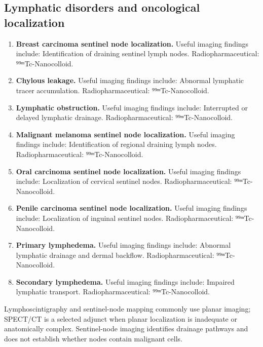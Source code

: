 \subsection{Lymphatic disorders and oncological localization}
\begin{enumerate}[leftmargin=*,itemsep=0.45em,topsep=0.4em]
\item \textbf{Breast carcinoma sentinel node localization.} Useful imaging findings include: Identification of draining sentinel lymph nodes. Radiopharmaceutical: ⁹⁹ᵐTc-Nanocolloid.
\item \textbf{Chylous leakage.} Useful imaging findings include: Abnormal lymphatic tracer accumulation. Radiopharmaceutical: ⁹⁹ᵐTc-Nanocolloid.
\item \textbf{Lymphatic obstruction.} Useful imaging findings include: Interrupted or delayed lymphatic drainage. Radiopharmaceutical: ⁹⁹ᵐTc-Nanocolloid.
\item \textbf{Malignant melanoma sentinel node localization.} Useful imaging findings include: Identification of regional draining lymph nodes. Radiopharmaceutical: ⁹⁹ᵐTc-Nanocolloid.
\item \textbf{Oral carcinoma sentinel node localization.} Useful imaging findings include: Localization of cervical sentinel nodes. Radiopharmaceutical: ⁹⁹ᵐTc-Nanocolloid.
\item \textbf{Penile carcinoma sentinel node localization.} Useful imaging findings include: Localization of inguinal sentinel nodes. Radiopharmaceutical: ⁹⁹ᵐTc-Nanocolloid.
\item \textbf{Primary lymphedema.} Useful imaging findings include: Abnormal lymphatic drainage and dermal backflow. Radiopharmaceutical: ⁹⁹ᵐTc-Nanocolloid.
\item \textbf{Secondary lymphedema.} Useful imaging findings include: Impaired lymphatic transport. Radiopharmaceutical: ⁹⁹ᵐTc-Nanocolloid.
\end{enumerate}
Lymphoscintigraphy and sentinel-node mapping commonly use planar imaging; SPECT/CT is a selected adjunct when planar localization is inadequate or anatomically complex. Sentinel-node imaging identifies drainage pathways and does not establish whether nodes contain malignant cells.

